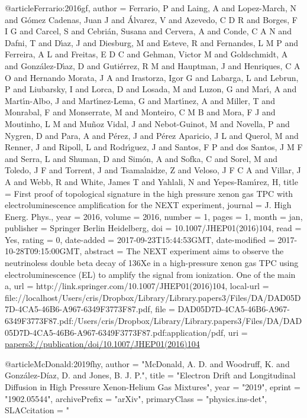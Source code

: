 {{{{{{{{{{{@article{Ferrario:2016gf,
author = {Ferrario, P and Laing, A and Lopez-March, N and G{\'o}mez Cadenas, Juan J and {\'A}lvarez, V and Azevedo, C D R and Borges, F I G and Carcel, S and Cebri{\'a}n, Susana and Cervera, A and Conde, C A N and Dafni, T and D{\'\i}az, J and Diesburg, M and Esteve, R and Fernandes, L M P and Ferreira, A L and Freitas, E D C and Gehman, Victor M and Goldschmidt, A and Gonz{\'a}lez-D{\'\i}az, D and Guti{\'e}rrez, R M and Hauptman, J and Henriques, C A O and Hernando Morata, J A and Irastorza, Igor G and Labarga, L and Lebrun, P and Liubarsky, I and Lorca, D and Losada, M and Luzon, G and Mar{\'\i}, A and Mart{\'\i}n-Albo, J and Mart{\'\i}nez-Lema, G and Mart{\'\i}nez, A and Miller, T and Monrabal, F and Monserrate, M and Monteiro, C M B and Mora, F J and Moutinho, L M and Mu{\~n}oz Vidal, J and Nebot-Guinot, M and Novella, P and Nygren, D and Para, A and P{\'e}rez, J and P{\'e}rez Aparicio, J L and Querol, M and Renner, J and Ripoll, L and Rodr{\'\i}guez, J and Santos, F P and dos Santos, J M F and Serra, L and Shuman, D and Sim{\'o}n, A and Sofka, C and Sorel, M and Toledo, J F and Torrent, J and Tsamalaidze, Z and Veloso, J F C A and Villar, J A and Webb, R and White, James T and Yahlali, N and Yepes-Ram{\'\i}rez, H},
title = {{First proof of topological signature in the high pressure xenon gas TPC with electroluminescence amplification for the NEXT experiment}},
journal = {J. High Energ. Phys.},
year = {2016},
volume = {2016},
number = {1},
pages = {1},
month = jan,
publisher = {Springer Berlin Heidelberg},
doi = {10.1007/JHEP01(2016)104},
read = {Yes},
rating = {0},
date-added = {2017-09-23T15:44:53GMT},
date-modified = {2017-10-28T09:15:00GMT},
abstract = {The NEXT experiment aims to observe the neutrinoless double beta decay of 136Xe in a high-pressure xenon gas TPC using electroluminescence (EL) to amplify the signal from ionization. One of the main a},
url = {http://link.springer.com/10.1007/JHEP01(2016)104},
local-url = {file://localhost/Users/cris/Dropbox/Library/Library.papers3/Files/DA/DAD05D7D-4CA5-46B6-A967-6349F3773F87.pdf},
file = {{DAD05D7D-4CA5-46B6-A967-6349F3773F87.pdf:/Users/cris/Dropbox/Library/Library.papers3/Files/DA/DAD05D7D-4CA5-46B6-A967-6349F3773F87.pdf:application/pdf}},
uri = {\url{papers3://publication/doi/10.1007/JHEP01(2016)104}}
}

@article{McDonald:2019fhy,
      author         = "McDonald, A. D. and Woodruff, K. and Gonz\'alez-D\'iaz, D.
                        and Jones, B. J. P.",
      title          = "{Electron Drift and Longitudinal Diffusion in High
                        Pressure Xenon-Helium Gas Mixtures}",
      year           = "2019",
      eprint         = "1902.05544",
      archivePrefix  = "arXiv",
      primaryClass   = "physics.ins-det",
      SLACcitation   = "%
}

}}}}}}}}}}}

